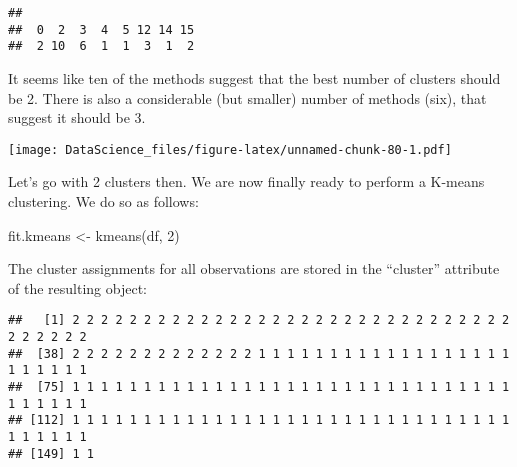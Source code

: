 \documentclass[
]{book}
\newenvironment{Shaded}{\begin{snugshade}}{\end{snugshade}}
\newcommand{\AttributeTok}[1]{\textcolor[rgb]{0.77,0.63,0.00}{#1}}
\newcommand{\DecValTok}[1]{\textcolor[rgb]{0.00,0.00,0.81}{#1}}
\newcommand{\FunctionTok}[1]{\textcolor[rgb]{0.00,0.00,0.00}{#1}}
\newcommand{\NormalTok}[1]{#1}
\newcommand{\OtherTok}[1]{\textcolor[rgb]{0.56,0.35,0.01}{#1}}
\newcommand{\SpecialCharTok}[1]{\textcolor[rgb]{0.00,0.00,0.00}{#1}}
\newcommand{\StringTok}[1]{\textcolor[rgb]{0.31,0.60,0.02}{#1}}
\begin{document}
\begin{verbatim}
## 
##  0  2  3  4  5 12 14 15 
##  2 10  6  1  1  3  1  2
\end{verbatim}

It seems like ten of the methods suggest that the best number of clusters should be 2. There is also a considerable (but smaller) number of methods (six), that suggest it should be 3.

\begin{Shaded}
\end{Shaded}

\texttt{[image: DataScience\_files/figure-latex/unnamed-chunk-80-1.pdf]}

Let's go with 2 clusters then. We are now finally ready to perform a K-means clustering. We do so as follows:

\begin{Shaded}
\begin{Highlighting}[]
\NormalTok{fit.kmeans }\OtherTok{\textless{}{-}} \FunctionTok{kmeans}\NormalTok{(df, }\DecValTok{2}\NormalTok{)}
\end{Highlighting}
\end{Shaded}

The cluster assignments for all observations are stored in the ``cluster'' attribute of the resulting object:

\begin{Shaded}
\end{Shaded}

\begin{verbatim}
##   [1] 2 2 2 2 2 2 2 2 2 2 2 2 2 2 2 2 2 2 2 2 2 2 2 2 2 2 2 2 2 2 2 2 2 2 2 2 2
##  [38] 2 2 2 2 2 2 2 2 2 2 2 2 2 1 1 1 1 1 1 1 1 1 1 1 1 1 1 1 1 1 1 1 1 1 1 1 1
##  [75] 1 1 1 1 1 1 1 1 1 1 1 1 1 1 1 1 1 1 1 1 1 1 1 1 1 1 1 1 1 1 1 1 1 1 1 1 1
## [112] 1 1 1 1 1 1 1 1 1 1 1 1 1 1 1 1 1 1 1 1 1 1 1 1 1 1 1 1 1 1 1 1 1 1 1 1 1
## [149] 1 1
\end{verbatim}
\end{document}

